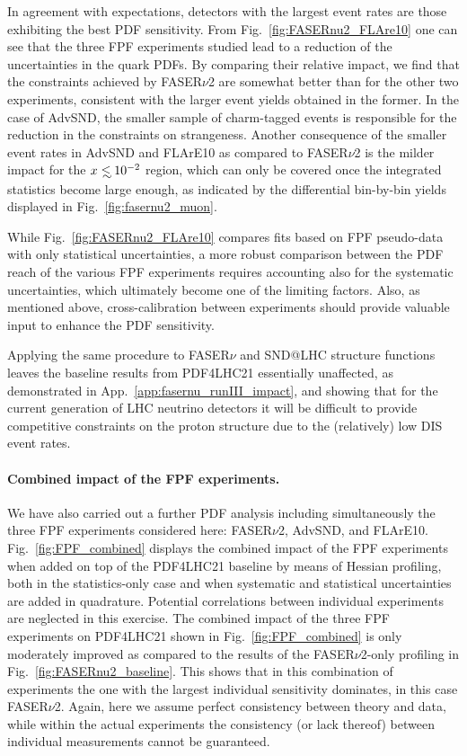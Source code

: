 In agreement with expectations, 
detectors with the largest event rates are those exhibiting the
best PDF sensitivity.
%
From Fig.~\ref{fig:FASERnu2_FLAre10} one can see that the three
FPF experiments studied lead to a reduction of the  uncertainties in the quark PDFs.
%
By comparing their relative impact, we find that the constraints
achieved by FASER$\nu$2 are somewhat better than for the other two experiments,
consistent with the larger event yields obtained in the former.
%
In the case of AdvSND, the  smaller sample of charm-tagged events is responsible for the reduction
in the constraints on strangeness.
%
Another consequence of the smaller event rates in AdvSND and FLArE10 as compared
to FASER$\nu$2 is the milder impact for the $x\lsim 10^{-2}$ region,
which can only be covered once the integrated statistics become large
enough,  as indicated by the differential bin-by-bin yields displayed in Fig.~\ref{fig:fasernu2_muon}.

While Fig.~\ref{fig:FASERnu2_FLAre10} compares fits based on FPF pseudo-data
with only statistical uncertainties, a more robust comparison between the PDF reach of
the various FPF experiments requires accounting also for the systematic uncertainties, which ultimately become
one of the limiting factors.
%
Also, as mentioned above, cross-calibration between experiments should provide
valuable input to enhance the PDF sensitivity.

Applying the same procedure to FASER$\nu$ and SND@LHC structure
functions leaves the baseline  results from PDF4LHC21 essentially
unaffected, as demonstrated in App.~\ref{app:fasernu_runIII_impact},
and showing that for the current generation of LHC neutrino detectors
it will be difficult to provide competitive constraints on the proton structure due
to the (relatively) low DIS event rates.

\paragraph{Combined impact of the FPF experiments.}
%
We have also carried out a further PDF analysis including simultaneously the three FPF experiments
considered here: FASER$\nu$2, AdvSND, and FLArE10.
%
Fig.~\ref{fig:FPF_combined} displays the combined impact of the FPF experiments when added
on top of the  PDF4LHC21 baseline by means of Hessian profiling, both in the statistics-only case and
when systematic and statistical uncertainties are added in quadrature.
%
Potential correlations between individual experiments are neglected in this exercise.
%
The combined impact of the three FPF experiments on PDF4LHC21 shown in Fig.~\ref{fig:FPF_combined}
is only moderately improved as compared to the results of the FASER$\nu$2-only profiling
in Fig.~\ref{fig:FASERnu2_baseline}.
%
This shows that in this combination of experiments the one with the largest individual
sensitivity dominates, in this case FASER$\nu$2.
%
Again, here we assume perfect consistency between theory and data, while
within the actual experiments the consistency (or lack thereof) between
individual measurements cannot be guaranteed.

